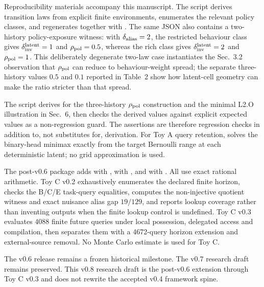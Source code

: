 \documentclass[10pt]{article}
\begin{document}
Reproducibility materials accompany this manuscript. The script  derives transition laws from explicit finite environments, enumerates the relevant policy classes, and regenerates  together with . The same JSON also contains a two-history policy-exposure witness: with $\delta_{\rm alias}=2$, the restricted behaviour class gives $\delta_{\rm inv}^{\rm latent}=1$ and $\rho_{\rm pol}=0.5$, whereas the rich class gives $\delta_{\rm inv}^{\rm latent}=2$ and $\rho_{\rm pol}=1$. This deliberately degenerate two-law case instantiates the Sec.~3.2 observation that $\rho_{\rm pol}$ can reduce to behaviour-weight spread; the separate three-history values $0.5$ and $0.1$ reported in Table~2 show how latent-cell geometry can make the ratio stricter than that spread.

The script  derives  for the three-history $\rho_{\rm pol}$ construction and the minimal L2.O illustration in Sec.~6, then checks the derived values against explicit expected values as a non-regression guard. The assertions are therefore regression checks in addition to, not substitutes for, derivation. For Toy A query retention,  solves the binary-head minimax exactly from the target Bernoulli range at each deterministic latent; no grid approximation is used.

The post-v0.6 package adds  with ,  with , and  with . All use exact rational arithmetic. Toy C v0.2 exhaustively enumerates the declared finite horizon, checks the B/C/E task-query equalities, computes the non-injective quotient witness and exact nuisance alias gap $19/129$, and reports lookup coverage rather than inventing outputs when the finite lookup control is undefined. Toy C v0.3 evaluates 4088 finite future queries under local possession, delegated access and compilation, then separates them with a 4672-query horizon extension and external-source removal. No Monte Carlo estimate is used for Toy C.

The v0.6 release remains a frozen historical milestone. The v0.7 research draft remains preserved. This v0.8 research draft is the post-v0.6 extension through Toy C v0.3 and does not rewrite the accepted v0.4 framework spine.
\end{document}
